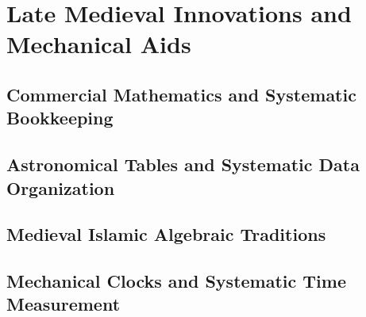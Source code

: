 
\chapter{Late Medieval Innovations and Mechanical Aids}

\section{Commercial Mathematics and Systematic Bookkeeping}

\section{Astronomical Tables and Systematic Data Organization}

\section{Medieval Islamic Algebraic Traditions}

\section{Mechanical Clocks and Systematic Time Measurement}
